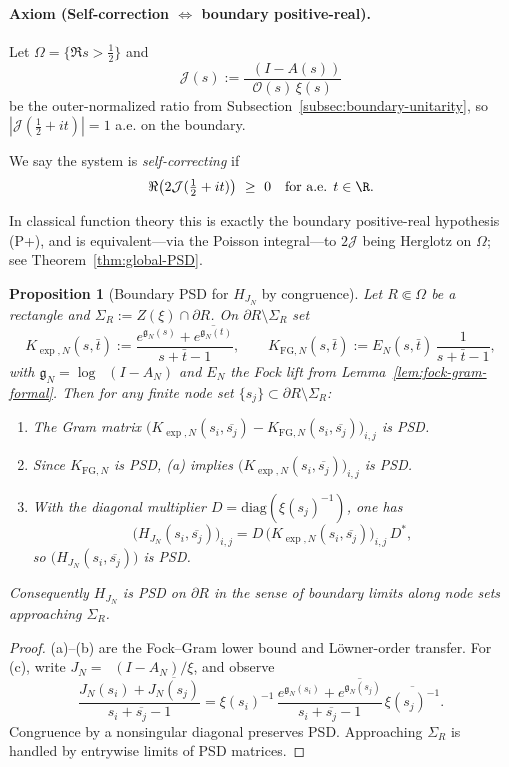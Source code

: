 \documentclass[11pt]{article}
\newtheorem{proposition}[theorem]{Proposition}
\theoremstyle{remark}
\DeclareMathOperator{\dettwo}{det_2}
\begin{document}
\paragraph{Axiom (Self-correction $\Leftrightarrow$ boundary positive-real).}
Let \(\Omega=\{\Re s>\tfrac12\}\) and
\[\mathcal J(s):=\frac{\dettwo(I-A(s))}{\mathcal O(s)\,\xi(s)}\]
be the outer-normalized ratio from Subsection~\ref{subsec:boundary-unitarity}, so $|\mathcal J(\tfrac12+it)|=1$ a.e. on the boundary. 
\begin{definition}\label{def:SC}
We say the system is \emph{self-correcting} if
\[\Re\bigl(2\mathcal J(\tfrac12+it)\bigr)\ \ge\ 0\quad\text{for a.e. }t\in\R.\]
\end{definition}
In classical function theory this is exactly the boundary positive-real hypothesis (P+), and is equivalent—via the Poisson integral—to $2\mathcal J$ being Herglotz on $\Omega$; see Theorem~\ref{thm:global-PSD}.
\begin{proposition}[Boundary PSD for $H_{J_N}$ by congruence]\label{prop:boundary-psd-fixed}
Let $R\Subset\Omega$ be a rectangle and $\Sigma_R:=Z(\xi)\cap\partial R$. On $\partial R\setminus\Sigma_R$ set
\[
K_{\exp,N}(s,\bar t):=\frac{e^{\mathfrak g_N(s)}+\overline{e^{\mathfrak g_N(t)}}}{s+\bar t-1},\qquad 
K_{\mathrm{FG},N}(s,\bar t):=E_N(s,\bar t)\,\frac{1}{s+\bar t-1},
\]
with $\mathfrak g_N=\log\dettwo(I-A_N)$ and $E_N$ the Fock lift from Lemma~\ref{lem:fock-gram-formal}. Then for any finite node set $\{s_j\}\subset\partial R\setminus\Sigma_R$:
\begin{enumerate}
\item[\textup{(a)}] The Gram matrix $\big(K_{\exp,N}(s_i,\overline{s_j})-K_{\mathrm{FG},N}(s_i,\overline{s_j})\big)_{i,j}$ is PSD.
\item[\textup{(b)}] Since $K_{\mathrm{FG},N}$ is PSD, (a) implies $\big(K_{\exp,N}(s_i,\overline{s_j})\big)_{i,j}$ is PSD.
\item[\textup{(c)}] With the diagonal multiplier $D=\mathrm{diag}(\xi(s_j)^{-1})$, one has
\[
\Big(H_{J_N}(s_i,\overline{s_j})\Big)_{i,j}=D\,\Big(K_{\exp,N}(s_i,\overline{s_j})\Big)_{i,j}\,D^{*},
\]
so $\big(H_{J_N}(s_i,\overline{s_j})\big)$ is PSD.
\end{enumerate}
Consequently $H_{J_N}$ is PSD on $\partial R$ in the sense of boundary limits along node sets approaching $\Sigma_R$.
\end{proposition}
\begin{proof}
(a)–(b) are the Fock–Gram lower bound and Löwner-order transfer. For (c), write $J_N=\dettwo(I-A_N)/\xi$, and observe
\[\frac{J_N(s_i)+\overline{J_N(s_j)}}{s_i+\overline{s_j}-1}=\xi(s_i)^{-1}\,\frac{e^{\mathfrak g_N(s_i)}+\overline{e^{\mathfrak g_N(s_j)}}}{s_i+\overline{s_j}-1}\,\overline{\xi(s_j)^{-1}}.\]
Congruence by a nonsingular diagonal preserves PSD. Approaching $\Sigma_R$ is handled by entrywise limits of PSD matrices.
\end{proof}
\end{document}
